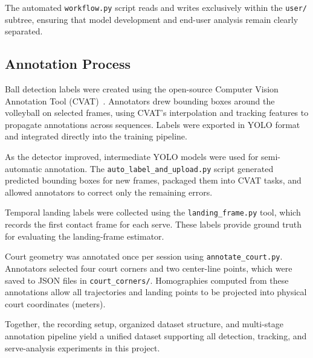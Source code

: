 The automated \texttt{workflow.py} script reads and writes exclusively within the \texttt{user/} subtree, ensuring that model development and end-user analysis remain clearly separated.

\subsection{Annotation Process}
Ball detection labels were created using the open-source Computer Vision Annotation Tool (CVAT)~\cite{cvat2023}. Annotators drew bounding boxes around the volleyball on selected frames, using CVAT’s interpolation and tracking features to propagate annotations across sequences. Labels were exported in YOLO format and integrated directly into the training pipeline.

As the detector improved, intermediate YOLO models were used for semi-automatic annotation. The \texttt{auto\_label\_and\_upload.py} script generated predicted bounding boxes for new frames, packaged them into CVAT tasks, and allowed annotators to correct only the remaining errors.

Temporal landing labels were collected using the \texttt{landing\_frame.py} tool, which records the first contact frame for each serve. These labels provide ground truth for evaluating the landing-frame estimator.

Court geometry was annotated once per session using \texttt{annotate\_court.py}. Annotators selected four court corners and two center-line points, which were saved to JSON files in \texttt{court\_corners/}. Homographies computed from these annotations allow all trajectories and landing points to be projected into physical court coordinates (meters).

Together, the recording setup, organized dataset structure, and multi-stage annotation pipeline yield a unified dataset supporting all detection, tracking, and serve-analysis experiments in this project.
